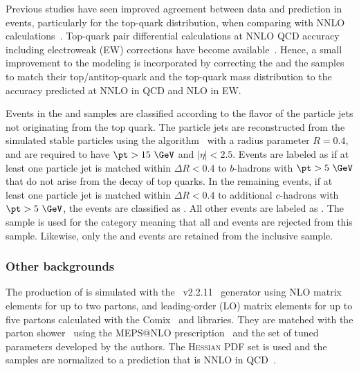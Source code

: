 Previous studies have seen improved agreement between data and prediction in \ttbar events, particularly for the top-quark \pt distribution, when comparing with NNLO calculations~\cite{TOPQ-2015-06}. Top-quark pair differential calculations at NNLO QCD accuracy including electroweak (EW) corrections have become available~\cite{Czakon:2017wor}. Hence, a small improvement to the modeling is incorporated by correcting the \ttbar and the \ttbb samples to match their top/antitop-quark \pt and the top-quark mass distribution to the accuracy predicted at NNLO in QCD and NLO in EW.

Events in the \ttbar and \ttbb samples are classified according to the flavor of the particle jets not originating from the top quark. The particle jets are
reconstructed from the simulated stable particles using the \antikt algorithm~\cite{Cacciari:2008gp, Fastjet} with a radius parameter $R=0.4$, and are required to have $\pt>15~\GeV$ and $|\eta|<2.5$. 
Events are labeled as \ttb if at least one particle jet is matched within $\Delta R<0.4$ to $b$-hadrons with $\pt>5~\GeV$ that do not arise from the decay of top quarks. %
In the remaining events, if at least one particle jet is matched within $\Delta R<0.4$ to additional $c$-hadrons with $\pt>5~\GeV$, the events are classified as \ttc. All other events are labeled as \ttlight. The \ttbb sample is used for the \ttb category meaning that all \ttlight and \ttc events are rejected from this sample. Likewise, only the \ttlight and \ttc events are retained from the inclusive \ttbar sample.  

\subsubsection{Other backgrounds}
The production of \Vjets is simulated with the \sherpa~v2.2.11~\cite{Bothmann:2019yzt} generator using NLO matrix elements for up to two partons, and leading-order (LO) matrix elements for up to five partons calculated with the Comix~\cite{Gleisberg:2008fv} and \openloops libraries.
They are matched with the \sherpa parton shower~\cite{Schumann:2007mg} using the MEPS@NLO prescription~\cite{Hoeche:2011fd,Hoeche:2012yf,Catani:2001cc,Hoeche:2009rj} and the set of tuned parameters developed by the \sherpa authors.
The \textsc{Hessian} \nnpdfnnlo PDF set is used and the samples are normalized to a prediction that is NNLO in QCD~\cite{Anastasiou:2003ds}.

